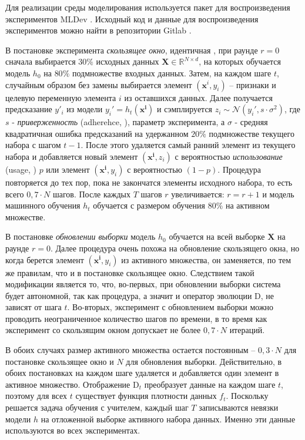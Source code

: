     Для реализации среды моделирования используется пакет для воспроизведения экспериментов MLDev \citep{khritankov2021mldev}. Исходный код и данные для воспроизведения экспериментов можно найти в репозитории Gitlab \footnotemark.


    В постановке эксперимента \emph{скользящее окно}, идентичная \citep{khritankov2023positive}, при раунде $r = 0$ сначала выбирается $30\%$ исходных данных $\textbf{X} \in \mathbb{R}^{N \times d}$, на которых обучается модель $h_0$ на $80\%$ подмножестве входных данных.   
    Затем, на каждом шаге $t$, случайным образом без замены выбирается элемент $(\mathbf{x}^i, y_i)$ -- признаки и целевую переменную элемента $i$ из оставшихся данных. Далее получается предсказание $y'_i$ из модели $y_i' = h_t(\mathbf{x^i})$ и сэмплируется $z_i \sim \mathcal{N}(y_i', s \cdot \sigma^2)$, где $s$ - \emph{приверженность} (adherehce,  \citep{khritankov2023positive}), параметр эксперимента, а $\sigma$ - средняя квадратичная ошибка предсказаний на удержанном $20\%$ подмножестве текущего набора с шагом $t - 1$. После этого удаляется самый ранний элемент из текущего набора и добавляется новый элемент $(\mathbf{x^i}, z_i)$ с вероятностью \emph{использование} (usage,  \citep{khritankov2023positive}) $p$ или элемент $(\mathbf{x^i}, y_i)$ с вероятностью $(1-p)$. Процедура повторяется до тех пор, пока не закончатся элементы исходного набора, то есть всего $0,7 \cdot N$ шагов. После каждых $T$ шагов $r$ увеличивается: $r = r + 1$ и модель машинного обучения $h_t$ обучается с размером обучения $80\%$ на активном множестве.

    В постановке \emph{обновлении выборки} модель $h_0$ обучается на всей выборке $\textbf{X}$ на раунде $r = 0$. Далее процедура очень похожа на обновление скользящего окна, но когда берется элемент $(\mathbf{x^i}, y_i)$ из активного множества, он заменяется, по тем же правилам, что и в постановке скользящее окно. Следствием такой модификации является то, что, во-первых, при обновлении выборки система будет автономной, так как процедура, а значит и оператор эволюции $\text{D}$, не зависят от шага $t$. Во-вторых, эксперимент с обновлением выборки можно проводить неограниченное количество шагов по времени, в то время как эксперимент со скользящим окном допускает не более $0,7 \cdot N$ итераций. 

    В обоих случаях размер активного множества остается постоянным -- $0,3 \cdot N$ для постановке скользящее окно и $N$ для обновления выборки. Действительно, в обоих постановках на каждом шаге удаляется и добавляется один элемент в активное множество. Отображение $\text{D}_t$ преобразует данные на каждом шаге $t$, поэтому для всех $t$ существует функция плотности данных $f_t$. Поскольку решается задача обучения с учителем, каждый шаг $T$ записываются невязки модели $h$ на отложенной выборке активного набора данных. Именно эти данные используются во всех экспериментах.

